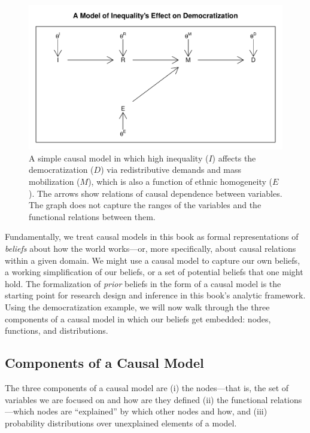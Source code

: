 \documentclass[
  12pt,
]{book}
\begin{document}
\begin{figure}

{\centering \includegraphics[width=0.8\linewidth]{ii_files/figure-latex/simpleDAG-1} 

}

\caption{A simple causal model in which high inequality ($I$) affects the democratization ($D$) via redistributive demands and mass mobilization ($M$), which is also a function of ethnic homogeneity ($E$). The arrows show relations of causal dependence between variables.  The graph does not capture the ranges of the variables and the functional relations between them.}\label{fig:simpleDAG}
\end{figure}

Fundamentally, we treat causal models in this book as formal representations of \emph{beliefs} about how the world works---or, more specifically, about causal relations within a given domain. We might use a causal model to capture our own beliefs, a working simplification of our beliefs, or a set of potential beliefs that one might hold. The formalization of \emph{prior} beliefs in the form of a causal model is the starting point for research design and inference in this book's analytic framework. Using the democratization example, we will now walk through the three components of a causal model in which our beliefs get embedded: nodes, functions, and distributions.

\hypertarget{components-of-a-causal-model}{%
\subsection{Components of a Causal Model}\label{components-of-a-causal-model}}

The three components of a causal model are (i) the nodes---that is, the set of variables we are focused on and how are they defined (ii) the functional relations---which nodes are ``explained'' by which other nodes and how, and (iii) probability distributions over unexplained elements of a model.
\end{document}
